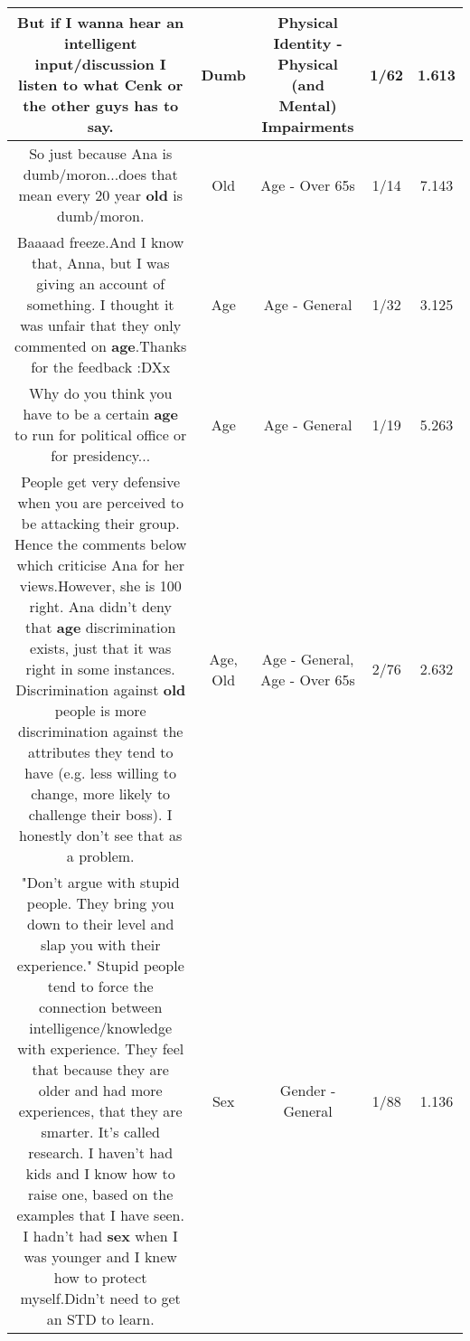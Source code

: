 \documentclass[11pt]{article}
\newlength\mylength
\begin{document}
\begin{center}
\begin{longtable}{|C{.65\mylength}|C{.30\mylength}|C{.12\mylength}|C{.12\mylength}|C{.12\mylength}|}
But if I wanna hear an intelligent input/discussion I listen to what Cenk or the other guys has to say.\normalsize   & Dumb & Physical Identity - Physical (and Mental) Impairments & 1/62 & 1.613 \\  \hline
  \small So just because Ana is dumb/moron...does that mean every 20 year \textbf{old} is dumb/moron.\normalsize   & Old & Age - Over 65s & 1/14 & 7.143 \\  \hline
  \small Baaaad freeze.And I know that, Anna, but I was giving an account of something. I thought it was unfair that they only commented on \textbf{age}.Thanks for the feedback :DXx\normalsize   & Age & Age - General & 1/32 & 3.125 \\  \hline
  \small Why do you think you have to be a certain \textbf{age} to run for political office or for presidency...\normalsize   & Age & Age - General & 1/19 & 5.263 \\  \hline
  \small People get very defensive when you are perceived to be attacking their group. Hence the comments below which criticise Ana for her views.However, she is 100 right. Ana didn't deny that \textbf{age} discrimination exists, just that it was right in some instances. Discrimination against \textbf{old} people is more discrimination against the attributes they tend to have (e.g. less willing to change, more likely to challenge their boss). I honestly don't see that as a problem.\normalsize   & Age, Old & Age - General, Age - Over 65s & 2/76 & 2.632 \\  \hline
  \small "Don't argue with stupid people. They bring you down to their level and slap you with their experience."  Stupid people tend to force the connection between intelligence/knowledge with experience.  They feel that because they are older and had more experiences, that they are smarter. It's called research. I haven't had kids and I know how to raise one, based on the examples that I have seen.  I hadn't had \textbf{sex} when I was younger and I knew how to protect myself.Didn't need to get an STD to learn.\normalsize   & Sex & Gender - General & 1/88 & 1.136 \\  \hline

\end{longtable}
\end{center}
\end{document}
